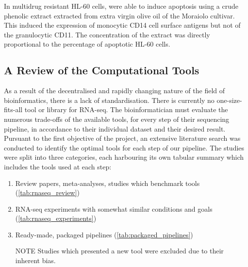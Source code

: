 In multidrug resistant HL-60 cells, \cite{crescimanno2009effects} were able to induce apoptosis using a crude phenolic extract extracted from extra virgin olive oil of the Moraiolo cultivar. This induced the expression of monocytic CD14 cell surface antigens but not of the granulocytic CD11. The concentration of the extract was directly proportional to the percentage of apoptotic HL-60 cells. 





\subsection{A Review of the Computational Tools}
\label{Computational Tools}
As a result of the decentralised and rapidly changing nature of the field of bioinformatics, there is a lack of standardisation. There is currently no one-size-fits-all tool or library for RNA-seq. The bioinformatician must evaluate the numerous trade-offs of the available tools, for every step of their sequencing pipeline, in accordance to their individual dataset and their desired result. Pursuant to the first objective of the project, an extensive literature search was conducted to identify the optimal tools for each step of our pipeline. The studies were split into three categories, each harbouring its own tabular summary which includes the tools used at each step:

\begin{enumerate}
\item Review papers, meta-analyses, studies which benchmark tools (\autoref{tab:rnaseq_review})
\item RNA-seq experiments with somewhat similar conditions and goals (\autoref{tab:rnaseq_experiments})
\item Ready-made, packaged pipelines (\autoref{tab:packaged_pipelines})
\item[NOTE] Studies which presented a new tool were excluded due to their inherent bias.
\end{enumerate}

